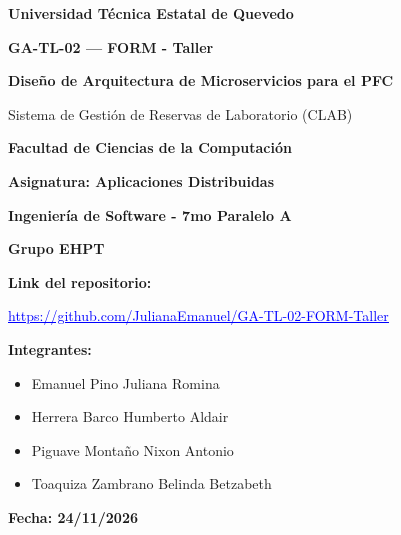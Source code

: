\thispagestyle{empty}
\begin{center}
\vspace*{0.6cm}
{\fontsize{20}{24}\selectfont\bfseries Universidad Técnica Estatal de Quevedo\par}
\vspace{1.5cm}
{\Large\bfseries GA-TL-02 --- FORM - Taller\par}
\vspace{0.45cm}
{\Large\bfseries Diseño de Arquitectura de Microservicios para el PFC\par}
\vspace{0.3cm}
{Sistema de Gestión de Reservas de Laboratorio (CLAB)\par}
\vspace{1cm}
\textbf{Facultad de Ciencias de la Computación}\par
\vspace{0.6cm}
\textbf{Asignatura: Aplicaciones Distribuidas}\par
\vspace{0.6cm}
\textbf{Ingeniería de Software - 7mo Paralelo A}\par
\textbf{Grupo EHPT}\par
\vspace{0.6cm}
\textbf{Link del repositorio:}\par
\vspace{0.25cm}
{\small\href{https://github.com/JulianaEmanuel/GA-TL-02-FORM-Taller}{\textcolor{blue}{\underline{https://github.com/JulianaEmanuel/GA-TL-02-FORM-Taller}}}\par}
\vspace{0.7cm}
\textbf{Integrantes:}\par
\vspace{0.25cm}
\begin{minipage}{0.78\linewidth}
\begin{itemize}
  \setlength{\itemsep}{0.45cm}
  \item Emanuel Pino Juliana Romina
  \item Herrera Barco Humberto Aldair
  \item Piguave Montaño Nixon Antonio
  \item Toaquiza Zambrano Belinda Betzabeth
\end{itemize}
\end{minipage}
\vspace{0.7cm}

\textbf{Fecha: 24/11/2026}\par
\end{center}
\newpage
